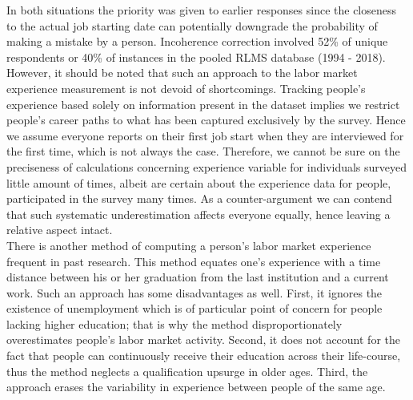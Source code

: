 \documentclass[12pt,a4paper]{article}
\begin{document}
In both situations the priority was given to earlier responses since the closeness to the actual job starting date can potentially downgrade the probability of making a mistake by a person. Incoherence correction involved 52\% of unique respondents or 40\% of instances in the pooled RLMS database (1994 - 2018). However, it should be noted that such an approach to the labor market experience measurement is not devoid of shortcomings. Tracking people's experience based solely on information present in the dataset implies we restrict people's career paths to what has been captured exclusively by the survey. Hence we assume everyone reports on their first job start when they are interviewed for the first time, which is not always the case. Therefore, we cannot be sure on the preciseness of calculations concerning experience variable for individuals surveyed little amount of times, albeit are certain about the experience data for people, participated in the survey many times. As a counter-argument we can contend that such systematic underestimation affects everyone equally, hence leaving a relative aspect intact.
\\

There is another method of computing a person's labor market experience frequent in past research. This method equates one's experience with a time distance between his or her graduation from the last institution and a current work. Such an approach has some disadvantages as well. First, it ignores the existence of unemployment which is of particular point of concern for people lacking higher education; that is why the method disproportionately overestimates people's labor market activity. Second, it does not account for the fact that people can continuously receive their education across their life-course, thus the method neglects a qualification upsurge in older ages. Third, the approach erases the variability in experience between people of the same age.
\\
\end{document}
